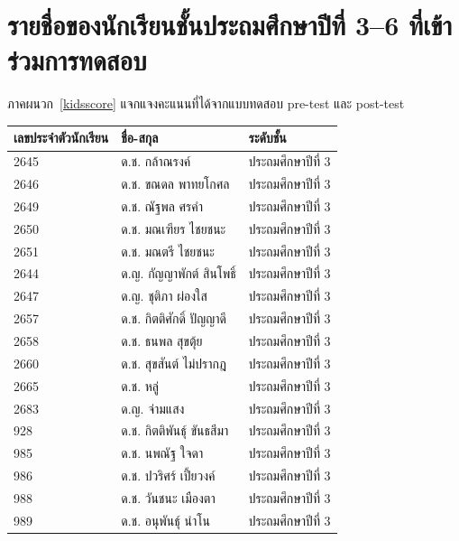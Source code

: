 \section{รายชื่อของนักเรียนชั้นประถมศึกษาปีที่ 3--6 ที่เข้าร่วมการทดสอบ}
ภาคผนวก~\ref{kidsscore} แจกแจงคะแนนที่ได้จากแบบทดสอบ pre-test และ post-test
\begin{table}[h]
    \begin{center}
        \begin{tabular}{ |p{3cm}|p{4cm}|p{3cm}| }
            \hline
            เลขประจำตัวนักเรียน & ชื่อ-สกุล & ระดับชั้น\\
            \hline\hline
            2645 & ด.ช. กล้าณรงค์ & ประถมศึกษาปีที่ 3\\
            \hline
            2646 & ด.ช. ขณดล พาทยโกศล & ประถมศึกษาปีที่ 3\\
            \hline
            2649 & ด.ช. ณัฐพล ศรคำ & ประถมศึกษาปีที่ 3\\
            \hline
            2650 & ด.ช. มณเฑียร ไชยชนะ & ประถมศึกษาปีที่ 3\\
            \hline
            2651 & ด.ช. มณตรี ไชยชนะ & ประถมศึกษาปีที่ 3\\
            \hline
            2644 & ด.ญ. กัญญาพักต์ สินโพธิ์ & ประถมศึกษาปีที่ 3\\
            \hline
            2647 & ด.ญ. ชุติภา ผ่องใส & ประถมศึกษาปีที่ 3\\
            \hline
            2657 & ด.ช. กิตติศักดิ์ ปัญญาดี & ประถมศึกษาปีที่ 3\\
            \hline
            2658 & ด.ช. ธนพล สุขตุ้ย & ประถมศึกษาปีที่ 3\\
            \hline
            2660 & ด.ช. สุขสันต์ ไม่ปรากฎ & ประถมศึกษาปีที่ 3\\
            \hline
            2665 & ด.ช. หลู่ & ประถมศึกษาปีที่ 3\\
            \hline
            2683 & ด.ญ. จ่ามแสง & ประถมศึกษาปีที่ 3\\
            \hline
            928 & ด.ช. กิตติพันธุ์ ขันธสีมา & ประถมศึกษาปีที่ 3\\
            \hline
            985 & ด.ช. นพณัฐ ใจดา & ประถมศึกษาปีที่ 3\\
            \hline
            986 & ด.ช. ปวริศร์ เปี้ยวงค์ & ประถมศึกษาปีที่ 3\\
            \hline
            988 & ด.ช. วันชนะ เมืองตา & ประถมศึกษาปีที่ 3\\
            \hline
            989 & ด.ช. อนุพันธุ์ นำโน & ประถมศึกษาปีที่ 3\\

\end{tabular}
\end{center}
\end{table}
